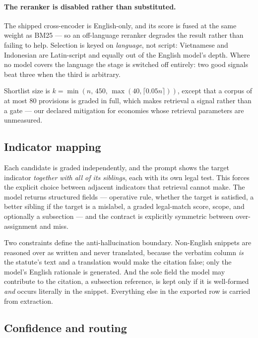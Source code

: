 \documentclass{article}
\begin{document}
\paragraph{The reranker is disabled rather than substituted.} The shipped
cross-encoder is English-only, and its score is fused at the same weight as
BM25 --- so an off-language reranker degrades the result rather than failing to
help. Selection is keyed on \emph{language}, not script: Vietnamese and
Indonesian are Latin-script and equally out of the English model's depth. Where
no model covers the language the stage is switched off entirely: two good
signals beat three when the third is arbitrary.

Shortlist size is
$k=\min(n,\,450,\,\max(40,\lceil 0.05n\rceil))$, except that a corpus of at most
80 provisions is graded in full, which makes retrieval a signal rather than a
gate --- our declared mitigation for economies whose retrieval parameters are
unmeasured.

\subsection{Indicator mapping}
\label{sec:map}

Each candidate is graded independently, and the prompt shows the target indicator
\emph{together with all of its siblings}, each with its own legal test. This
forces the explicit choice between adjacent indicators that retrieval cannot
make. The model returns structured fields --- operative rule, whether the target
is satisfied, a better sibling if the target is a mislabel, a graded legal-match
score, scope, and optionally a subsection --- and the contract is explicitly
symmetric between over-assignment and miss.

Two constraints define the anti-hallucination boundary. Non-English snippets are
reasoned over as written and never translated, because the verbatim column
\emph{is} the statute's text and a translation would make the citation false;
only the model's English rationale is generated. And the sole field the model may
contribute to the citation, a subsection reference, is kept only if it is
well-formed \emph{and} occurs literally in the snippet. Everything else in the
exported row is carried from extraction.

\subsection{Confidence and routing}
\label{sec:confidence}
\end{document}
